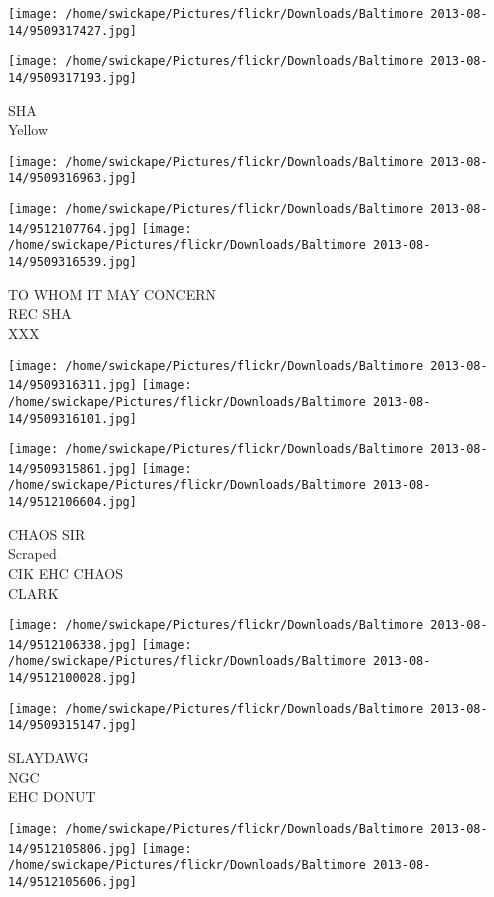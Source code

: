 \documentclass[10pt,letterpaper]{article}
\begin{document}
\texttt{[image: /home/swickape/Pictures/flickr/Downloads/Baltimore 2013-08-14/9509317427.jpg]}

\vspace{0.25in}
\texttt{[image: /home/swickape/Pictures/flickr/Downloads/Baltimore 2013-08-14/9509317193.jpg]}

SHA\\
Yellow
\pagebreak

\texttt{[image: /home/swickape/Pictures/flickr/Downloads/Baltimore 2013-08-14/9509316963.jpg]}

\vspace{0.25in}
\texttt{[image: /home/swickape/Pictures/flickr/Downloads/Baltimore 2013-08-14/9512107764.jpg]}
\texttt{[image: /home/swickape/Pictures/flickr/Downloads/Baltimore 2013-08-14/9509316539.jpg]}

TO WHOM IT MAY CONCERN\\
REC SHA\\
XXX
\pagebreak

\texttt{[image: /home/swickape/Pictures/flickr/Downloads/Baltimore 2013-08-14/9509316311.jpg]}
\texttt{[image: /home/swickape/Pictures/flickr/Downloads/Baltimore 2013-08-14/9509316101.jpg]}

\texttt{[image: /home/swickape/Pictures/flickr/Downloads/Baltimore 2013-08-14/9509315861.jpg]}
\texttt{[image: /home/swickape/Pictures/flickr/Downloads/Baltimore 2013-08-14/9512106604.jpg]}

CHAOS SIR\\
Scraped\\
CIK EHC CHAOS\\
CLARK
\pagebreak

\texttt{[image: /home/swickape/Pictures/flickr/Downloads/Baltimore 2013-08-14/9512106338.jpg]}
\texttt{[image: /home/swickape/Pictures/flickr/Downloads/Baltimore 2013-08-14/9512100028.jpg]}

\vspace{0.25in}
\texttt{[image: /home/swickape/Pictures/flickr/Downloads/Baltimore 2013-08-14/9509315147.jpg]}

SLAYDAWG\\
NGC\\
EHC DONUT
\pagebreak

\texttt{[image: /home/swickape/Pictures/flickr/Downloads/Baltimore 2013-08-14/9512105806.jpg]}
\texttt{[image: /home/swickape/Pictures/flickr/Downloads/Baltimore 2013-08-14/9512105606.jpg]}
\end{document}
